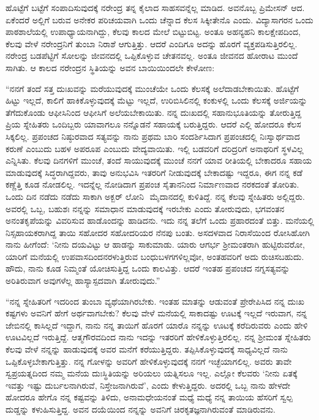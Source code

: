 ಹೊಟ್ಟೆಗೆ ಬಟ್ಟೆಗೆ ಸಂಪಾದಿಸುವುದಕ್ಕೆ ನರೇಂದ್ರ ತನ್ನ ಕೈಲಾದ ಸಾಹಸವನ್ನೆಲ್ಲ ಮಾಡಿದ. ಅವನೊಬ್ಬ ಪ್ರಿಮೇಸನ್ ಆದ. ಏಕೆಂದರೆ ಅಲ್ಲಿಗೆ ಬರುವ ಅನೇಕರ ಪರಿಚಯವಾಗಿ ಒಂದು ಚೆನ್ನಾದ ಕೆಲಸ ಸಿಕ್ಕೀತೇನೊ ಎಂದು. ವಿದ್ಯಾಸಾಗರನ ಒಂದು ಪಾಠಶಾಲೆಯಲ್ಲಿ ಉಪಾಧ್ಯಾಯನಾಗಿದ್ದು, ಕೆಲವು ಕಾಲದ ಮೇಲೆ ಬಿಟ್ಟುಬಿಟ್ಟ. ಅಂತೂ ಅಹನ್ಯಹನಿ ಕಾಲಕ್ಷೇಪದಿಂದ, ಕೆಲವು ವೇಳೆ ನರೇಂದ್ರನಿಗೆ ತುಂಬಾ ನಿರಾಶೆ ಆಗುತ್ತಿತ್ತು. ಆದರೆ ಎಂದಿಗೂ ಅದನ್ನು ಹೊರಗೆ ವ್ಯಕ್ತಪಡಿಸುತ್ತಿರಲಿಲ್ಲ. ನರೇಂದ್ರ ಬಡಪೆಟ್ಟಿಗೆ ಸೋಲನ್ನು ಜೀವನದಲ್ಲಿ ಒಪ್ಪಿಕೊಳ್ಳುವ ಚೇತನವಲ್ಲ. ಅಂತೂ ಜೀವನದ ಹೋರಾಟ ಮುಂದೆ ಸಾಗಿತು. ಆ ಕಾಲದ ನರೇಂದ್ರನ ಸ್ಥಿತಿಯನ್ನು ಅವನ ಬಾಯಿಯಿಂದಲೇ ಕೇಳೋಣ:

“ನನಗೆ ತಂದೆ ಸತ್ತ ದುಃಖವನ್ನು ಮರೆಯುವುದಕ್ಕೆ ಮುಂಚೆಯೇ ಒಂದು ಕೆಲಸಕ್ಕೆ ಅಲೆದಾಡಬೇಕಾಯಿತು. ಹೊಟ್ಟೆಗೆ ಹಿಟ್ಟು ಇಲ್ಲದೆ, ಕಾಲಿಗೆ ಹಾಕಿಕೊಳ್ಳುವುದಕ್ಕೆ ಮೆಟ್ಟು ಇಲ್ಲದೆ, ಉರಿಬಿಸಿಲಿನಲ್ಲಿ ಕಂಕುಳಲ್ಲಿ ಒಂದು ಕೆಲಸಕ್ಕೆ ಅರ್ಜಿಯನ್ನು ತೆಗೆದುಕೊಂಡು ಆಫೀಸಿನಿಂದ ಆಫೀಸಿಗೆ ಅಲೆಯಬೇಕಾಯಿತು. ನನ್ನ ದುಃಖದಲ್ಲಿ ಸಹಾನುಭೂತಿಯನ್ನು ತೋರುತ್ತಿದ್ದ ಪ್ರಿಯ ಸ್ನೇಹಿತರು ಒಂದಿಬ್ಬರು ಯಾವಾಗಲೂ ನನ್ನೊಡನೆ ಸಹಾಯಕ್ಕೆ ಬರುತ್ತಿದ್ದರು. ಆದರೆ ಎಲ್ಲಿ ಹೋದರೂ ಕೆಲಸ ಸಿಕ್ಕಲಿಲ್ಲ. ಪ್ರಪಂಚದ ನಿಷ್ಠುರವಾದ ಸತ್ಯವನ್ನು ನಾನು ಪ್ರಥಮ ಬಾರಿ ಸಂದರ್ಶಿಸಿದಾಗ ಪ್ರಪಂಚದಲ್ಲಿ ನಿಃಸ್ವಾರ್ಥವಾದ ಕರುಣೆ ಎಂಬುದು ಬಹಳ ಅಪರೂಪ ಎಂಬುದು ವೇದ್ಯವಾಯಿತು. ಇಲ್ಲಿ ಬಡವರಿಗೆ ದರಿದ್ರರಿಗೆ ಅನಾಥರಿಗೆ ಸ್ಥಳವಿಲ್ಲ ಎನ್ನಿಸಿತು. ಕೆಲವು ದಿನಗಳಿಗೆ ಮುಂಚೆ, ತಂದೆ ಸಾಯುವುದಕ್ಕೆ ಮುಂಚೆ ನನಗೆ ಯಾವ ರೀತಿಯಲ್ಲಿ ಬೇಕಾದರೂ ಸಹಾಯ ಮಾಡುವುದಕ್ಕೆ ಸಿದ್ಧರಾಗಿದ್ದವರು, ತಾವು ಅನುಭವಿಸಿ ಇತರರಿಗೆ ನೀಡುವುದಕ್ಕೆ ಬೇಕಾದಷ್ಟು ಇದ್ದರೂ, ಈಗ ನನ್ನ ಕಡೆ ಕಣ್ಣೆತ್ತಿ ಕೂಡ ನೋಡಲಿಲ್ಲ. ಇದನ್ನೆಲ್ಲ ನೋಡಿದಾಗ ಪ್ರಪಂಚ ಸೈತಾನನಿಂದ ನಿರ್ಮಾಣವಾದ ನರಕದಂತೆ ತೋರಿತು. ಒಂದು ದಿನ ನಡೆದು ನಡೆದು ಸಾಕಾಗಿ ಅಕ್ಬರ್ ಲೋನಿ ‍ ಮೈದಾನದಲ್ಲಿ ಕುಳಿತಿದ್ದೆ. ನನ್ನ ಕೆಲವು ಸ್ನೇಹಿತರು ಅಲ್ಲಿದ್ದರು. ಅವರಲ್ಲಿ ಒಬ್ಬ, ಬಹುಶಃ ನನ್ನನ್ನು ಸಮಾಧಾನ ಮಾಡುವುದಕ್ಕೆ ಇರಬೇಕು ಎಂದು ತೋರುವುದು, ಭಗವಂತನ ಅನಂತಕೃಪೆಯನ್ನು ವಿವರಿಸುವ ಹಾಡೊಂದನ್ನು ಹಾಡಿದನು. ಇದು ನನ್ನ ತಲೆಗೆ ಒಂದು ಪ್ರಹಾರದಂತೆ ಬಿತ್ತು. ಮನೆಯಲ್ಲಿ ನಿಸ್ಸಹಾಯಕರಾಗಿದ್ದ ತಾಯಿ ಸಹೋದರ ಸಹೋದರಿಯರ ನೆನಪು ಬಂತು. ಅಸದಳವಾದ ನಿರಾಸೆಯಿಂದ ರೋಸಿಹೋಗಿ ನಾನು ಹೀಗೆಂದೆ: ‘ನೀನು ದಯವಿಟ್ಟು ಆ ಹಾಡನ್ನು ಸಾಕುಮಾಡು. ಯಾರು ಆಗರ್ಭ ಶ‍್ರೀಮಂತರಾಗಿ ಹುಟ್ಟಿರುವರೋ, ಯಾರಿಗೆ ಮನೆಯಲ್ಲಿ ಉಪವಾಸದಿಂದ\break ನರಳುತ್ತಿರುವ ಬಂಧುಬಳಗಗಳಿಲ್ಲವೋ, ಅಂತಹವರಿಗೆ ಅದು ರುಚಿಸಬಹುದು. ಹೌದು, ನಾನು ಕೂಡ ನಿಮ್ಮಂತೆ ಯೋಚಿಸುತ್ತಿದ್ದ ಒಂದು ಕಾಲವಿತ್ತು. ಆದರೆ ಇಂತಹ ಪ್ರಪಂಚದ ನಗ್ನಸತ್ಯವನ್ನು ಅರಿತಿರುವಾಗ ಅವುಗಳೆಲ್ಲ ಹಾಸ್ಯಾಸ್ಪದವಾಗಿ ತೋರುವುದು.”

“ನನ್ನ ಸ್ನೇಹಿತರಿಗೆ ಇದರಿಂದ ತುಂಬಾ ವ್ಯಥೆಯಾಗಿರಬೇಕು. ಇಂತಹ ಮಾತನ್ನು ಆಡುವಂತೆ ಪ್ರೇರೇಪಿಸಿದ ನನ್ನ ದುಃಖ ಕಷ್ಟಗಳು ಅವನಿಗೆ ಹೇಗೆ ಅರ್ಥವಾಗಬೇಕು? ಕೆಲವು ವೇಳೆ ಮನೆಯಲ್ಲಿ ಸಾಕಾದಷ್ಟು ಊಟಕ್ಕೆ ಇಲ್ಲದೆ ಇರುವಾಗ, ನನ್ನ ಜೇಬಿನಲ್ಲಿ ಕಾಸಿಲ್ಲದೆ ಇದ್ದಾಗ, ನಾನು ನನ್ನ ತಾಯಿಗೆ ಹೊರಗೆ ಯಾರೊ ನನ್ನನ್ನು ಊಟಕ್ಕೆ ಕರೆದಿರುವರು ಎಂದು ಹೇಳಿ ಊಟವಿಲ್ಲದೆ ಇರುತ್ತಿದ್ದೆ. ಆತ್ಮಗೌರವದಿಂದ ನಾನು ಇದನ್ನು ಇತರರಿಗೆ ಹೇಳಿಕೊಳ್ಳುತ್ತಿರಲಿಲ್ಲ. ನನ್ನ ಶ‍್ರೀಮಂತ ಸ್ನೇಹಿತರು ಕೆಲವು ವೇಳೆ ನನ್ನನ್ನು ಹಾಡುವುದಕ್ಕೆ ಅವರ ಮನೆಗೆ ಕರೆಯುತ್ತಿದ್ದರು. ತಪ್ಪಿಸಿಕೊಳ್ಳುವುದಕ್ಕೆ ಸಾಧ್ಯವಿಲ್ಲದೆ ನಾನು ಒಪ್ಪಿಕೊಳ್ಳಬೇಕಾಗುತ್ತಿತ್ತು. ನನ್ನ ಗೋಳನ್ನು ಅವರಿಗೆ ಹೇಳಿಕೊಳ್ಳುವುದಕ್ಕೆ ನನಗೆ ಇಚ್ಛೆಯಾಗಲಿಲ್ಲ. ಅವರು ತಾವೇ ಸ್ವಪ್ರಯತ್ನದಿಂದ ನಮ್ಮ ಮನೆಯ ದುಃಸ್ಥಿತಿಯನ್ನು ಅರಿಯಲು ಯತ್ನಿಸಲೂ ಇಲ್ಲ. ಎಲ್ಲೋ ಕೆಲವರು ‘ನೀನು ಏತಕ್ಕೆ ಇವತ್ತು ಇಷ್ಟು ದುರ್ಬಲನಾಗಿರುವೆ, ನಿಸ್ತೇಜನಾಗಿರುವೆ’, ಎಂದು ಕೇಳುತ್ತಿದ್ದರು. ಅದರಲ್ಲಿ ಒಬ್ಬ ನಾನು ಹೇಳದೇ ಹೋದರೂ ಹೇಗೊ ನನ್ನ ಕಷ್ಟವನ್ನು ತಿಳಿದು, ಅನಾಮಧೇಯನಂತೆ ಮಧ್ಯೆ ಮಧ್ಯೆ ನನ್ನ ತಾಯಿಯ ಹೆಸರಿಗೆ ಸ್ವಲ್ಪ ದುಡ್ಡನ್ನು ಕಳುಹಿಸುತ್ತಿದ್ದ. ಅವನ ದಯೆಯಿಂದ ನನ್ನನ್ನು ಅವನಿಗೆ ಚಿರಕೃತಜ್ಞನಾಗಿರುವಂತೆ ಮಾಡಿರುವನು.


